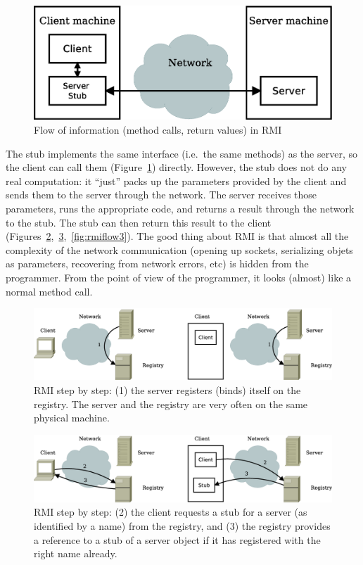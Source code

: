 \begin{figure}[hbtp]
  \centering
  \includegraphics[width=\textwidth]{gfx/rmi-flow}
  \caption{Flow of information (method calls, return values) in RMI}
  \label{fig:rmiflow}
\end{figure}

The stub implements the same interface (i.e.~the same methods) as the
server, so the client can call them (Figure~\ref{fig:rmiflow}) directly. 
However, the stub does not do any
real computation: it ``just'' packs up the parameters provided by the client and
sends them to the server through the network. The server receives
those parameters, runs the appropriate code, and returns a result
through the network to the stub. The stub can then return this result
to the client 
(Figures~\ref{fig:rmiflow1},~\ref{fig:rmiflow2},~\ref{fig:rmiflow3}). 
The good thing about RMI is that almost all the
complexity of the network communication (opening up sockets,
serializing objets as parameters, recovering from network errors, etc)
is hidden from the programmer. From the point of view of the programmer, it
looks (almost) like a normal method call. 

\begin{figure}[hbtp]
  \centering
  \includegraphics[width=\textwidth]{gfx/rmi-steps1}
  \caption{RMI step by step: (1) the server registers (binds) itself
    on the registry. The server and the registry are very often on the
    same physical machine. }
  \label{fig:rmiflow1}
\end{figure}

\begin{figure}[hbtp]
  \centering
  \includegraphics[width=\textwidth]{gfx/rmi-steps2}
  \caption{RMI step by step: (2) the client requests a stub for a
    server (as identified by a name) from the registry, 
    and (3) the registry provides a
    reference to a stub of a server object if it
    has registered with the right name already. }
  \label{fig:rmiflow2}
\end{figure}

